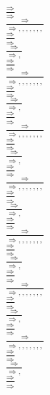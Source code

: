 \documentclass[11pt]{article}
\begin{document}
\begin{center}
\bigskip
\\$\frac{\Rightarrow }{\Rightarrow }$
\bigskip
\\$\frac{\Rightarrow }{\Rightarrow , , , , , , , }$
\bigskip
\\$\frac{\Rightarrow }{\Rightarrow }$
\bigskip
\\$\frac{\Rightarrow }{\Rightarrow , }$
\bigskip
\\$\frac{\Rightarrow }{\Rightarrow }$
\bigskip
\\$\frac{\Rightarrow }{\Rightarrow , , , , , , , }$
\bigskip
\\$\frac{\Rightarrow }{\Rightarrow }$
\bigskip
\\$\frac{\Rightarrow }{\Rightarrow , }$
\bigskip
\\$\frac{\Rightarrow }{\Rightarrow }$
\bigskip
\\$\frac{\Rightarrow }{\Rightarrow , , , , , , , }$
\bigskip
\\$\frac{\Rightarrow }{\Rightarrow }$
\bigskip
\\$\frac{\Rightarrow }{\Rightarrow , }$
\bigskip
\\$\frac{\Rightarrow }{\Rightarrow }$
\bigskip
\\$\frac{\Rightarrow }{\Rightarrow , , , , , , , }$
\bigskip
\\$\frac{\Rightarrow }{\Rightarrow }$
\bigskip
\\$\frac{\Rightarrow }{\Rightarrow , }$
\bigskip
\\$\frac{\Rightarrow }{\Rightarrow }$
\bigskip
\\$\frac{\Rightarrow }{\Rightarrow , , , , , , , }$
\bigskip
\\$\frac{\Rightarrow }{\Rightarrow }$
\bigskip
\\$\frac{\Rightarrow }{\Rightarrow , }$
\bigskip
\\$\frac{\Rightarrow }{\Rightarrow }$
\bigskip
\\$\frac{\Rightarrow }{\Rightarrow , , , , , , , }$
\bigskip
\\$\frac{\Rightarrow }{\Rightarrow }$
\bigskip
\\$\frac{\Rightarrow }{\Rightarrow , }$
\bigskip
\\$\frac{\Rightarrow }{\Rightarrow }$
\bigskip
\\$\frac{\Rightarrow }{\Rightarrow , , , , , , , }$
\bigskip
\\$\frac{\Rightarrow }{\Rightarrow }$
\bigskip
\\$\frac{\Rightarrow }{\Rightarrow , }$
\bigskip
\\$\frac{\Rightarrow }{\Rightarrow }$

\end{center}
\end{document}
